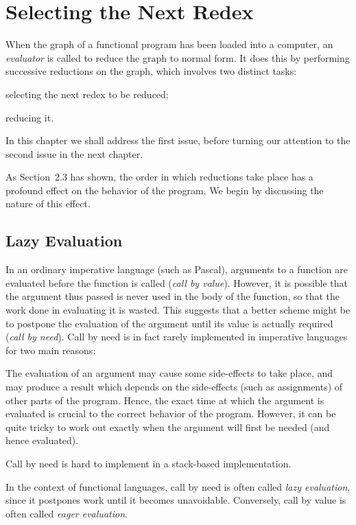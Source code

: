 \chapter{Selecting the Next Redex}
\vspace{2cm}

When the graph of a functional program has been loaded into a computer, an
\textit{evaluator} is called to reduce the graph to normal form. It does this by
performing successive reductions on the graph, which involves two distinct
tasks:
\begin{numbered}
    \item selecting the next redex to be reduced;
    \item reducing it.
\end{numbered}
In this chapter we shall address the first issue, before turning our attention to
the second issue in the next chapter.

As Section~2.3 has shown, the order in which reductions take place has a
profound effect on the behavior of the program. We begin by discussing the
nature of this effect.

\section{Lazy Evaluation}

In an ordinary imperative language (such as Pascal), arguments to a function
are evaluated before the function is called (\textit{call by value}). However, it is
possible that the argument thus passed is never used in the body of the
function, so that the work done in evaluating it is wasted. This suggests that a
better scheme might be to postpone the evaluation of the argument until its
value is actually required (\textit{call by need}). Call by need is in fact rarely
implemented in imperative languages for two main reasons:

\begin{numbered}
    \item The evaluation of an argument may cause some side-effects to take place,
    and may produce a result which depends on the side-effects (such as
    assignments) of other parts of the program. Hence, the exact time at
    which the argument is evaluated is crucial to the correct behavior of the
    program. However, it can be quite tricky to work out exactly when the
    argument will first be needed (and hence evaluated).
    \item Call by need is hard to implement in a stack-based implementation.
\end{numbered}
In the context of functional languages, call by need is often called \textit{lazy
evaluation}, since it postpones work until it becomes unavoidable. Conversely,
call by value is often called \textit{eager evaluation}.

